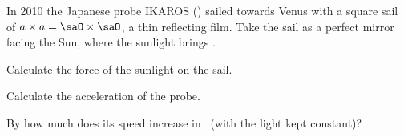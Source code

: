 In 2010 the Japanese probe IKAROS (\miO) sailed towards Venus with a square sail of $a\times a = \saO\times\saO$, a thin reflecting film. Take the sail as a perfect mirror facing the Sun, where the sunlight brings \IsO.

\begin{abcliste}
\abc Calculate the force of the sunlight on the sail.

\abc Calculate the acceleration of the probe.

\abc By how much does its speed increase in \tdO\ (with the light kept constant)?
\end{abcliste}
